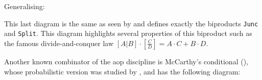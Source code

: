 \documentclass[
  oneside,
  11pt, a4paper,
  footinclude=true,
  headinclude=true,
  cleardoublepage=empty
]{scrbook}
\theoremstyle{definition}
\theoremstyle{definition}
\begin{document}
        \begin{center}
        \end{center}{}
        
        Generalising:
        
        \begin{center}
        \end{center}{}
        
        This last diagram is the same as seen by \cite{Macedo2012MatricesAA} and defines exactly the biproducts \texttt{Junc} and \texttt{Split}. This diagram highlights several properties of this biproduct such as the famous divide-and-conquer law $[A|B] \cdot [\frac{C}{D}] = A \cdot C + B \cdot D$.
        
        Another known combinator of the \gls{aop} discipline is McCarthy's conditional (\cite{Bird:1997:AP:248932}), whose probabilistic version was studied by \cite{oliveira2012towards}, and has the following diagram:
        
\end{document}
